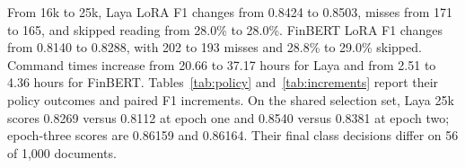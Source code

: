 From 16k to 25k, Laya LoRA F1 changes from 0.8424 to 0.8503, misses from 171 to 165, and skipped reading from 28.0\% to 28.0\%. FinBERT LoRA F1 changes from 0.8140 to 0.8288, with 202 to 193 misses and 28.8\% to 29.0\% skipped. Command times increase from 20.66 to 37.17 hours for Laya and from 2.51 to 4.36 hours for FinBERT. Tables~\ref{tab:policy} and~\ref{tab:increments} report their policy outcomes and paired F1 increments. On the shared selection set, Laya 25k scores 0.8269 versus 0.8112 at epoch one and 0.8540 versus 0.8381 at epoch two; epoch-three scores are 0.86159 and 0.86164. Their final class decisions differ on 56 of 1,000 documents.
